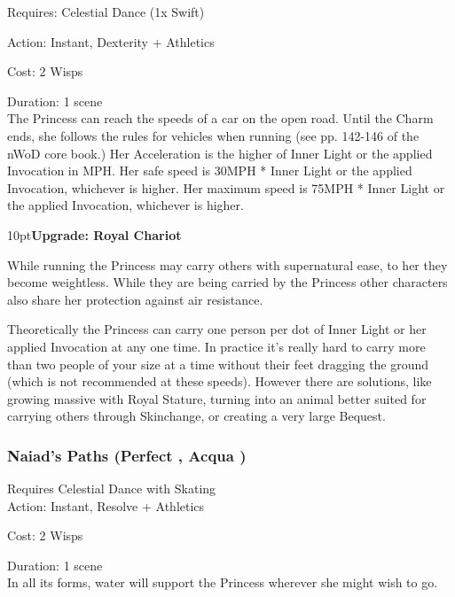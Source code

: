 \noindent Requires: Celestial Dance (1x Swift)

\noindent Action: Instant, Dexterity + Athletics

\noindent Cost: 2 Wisps

\noindent Duration: 1 scene \\

\noindent The Princess can reach the speeds of a car on the open road. Until the Charm ends, she follows the rules for vehicles when running (see pp. 142-146 of the nWoD core book.) Her Acceleration is the higher of Inner Light or the applied Invocation in MPH. Her safe speed is 30MPH * Inner Light or the applied Invocation, whichever is higher. Her maximum speed is 75MPH * Inner Light or the applied Invocation, whichever is higher. 

\begin{myindentpar}{10pt}\textbf{Upgrade: Royal Chariot}

While running the Princess may carry others with supernatural ease, to her they become weightless. While they are being carried by the Princess other characters also share her protection against air resistance.

Theoretically the Princess can carry one person per dot of Inner Light or her applied Invocation at any one time. In practice it's really hard to carry more than two people of your size at a time without their feet dragging the ground (which is not recommended at these speeds). However there are solutions, like growing massive with Royal Stature, turning into an animal better suited for carrying others through Skinchange, or creating a very large Bequest. 


\end{myindentpar}


\subsubsection*{Naiad's Paths (Perfect \textbullet\textbullet\textbullet, Acqua \textbullet\textbullet)}
\noindent Requires Celestial Dance with Skating\\

\noindent Action: Instant, Resolve + Athletics

\noindent Cost: 2 Wisps

\noindent Duration: 1 scene\\

\noindent In all its forms, water will support the Princess wherever she might wish to go.


